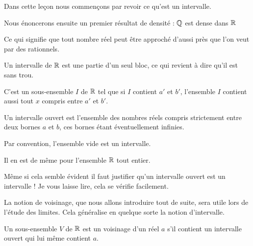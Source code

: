 







\debuttexte


\diapo

\change

\change

Dans cette leçon nous commençons par revoir ce qu'est un intervalle.

\change


Nous énoncerons ensuite un premier résultat de densité : 
$\mathbb{Q}$ est dense dans $\mathbb{R}$ 

Ce qui signifie que tout nombre réel peut être approché d'aussi près que l'on veut par des rationnels.



\diapo

Un intervalle de $\mathbb{R}$ est une partie \og{}d'un seul bloc\fg{}, ce qui revient à dire qu'il est sans \og{}trou\fg{}.

C'est un sous-ensemble $I$ de $\mathbb{R}$ tel que si 
$I$ contient $a'$ et $b'$, l'ensemble $I$ contient aussi tout $x$ compris entre $a'$ et $b'$.


\change

Un intervalle ouvert est l'ensemble des nombres 
réels compris strictement entre deux bornes $a$ et $b$, ces bornes étant éventuellement infinies.


\change

Par convention, l'ensemble vide est un intervalle.



Il en est de même pour l'ensemble $\mathbb{R}$ tout entier.



Même si cela semble évident il faut justifier qu'un intervalle ouvert 
est un intervalle !  Je vous laisse lire, cela se vérifie facilement.



\diapo

La notion de voisinage, que nous allons introduire tout de suite, sera utile lors de l'étude des limites.
Cela généralise en quelque sorte la notion d'intervalle.


Un sous-ensemble $V$ de $\mathbb{R}$ est 
un voisinage d'un réel $a$ s'il contient un intervalle ouvert qui lui même contient $a$. 



